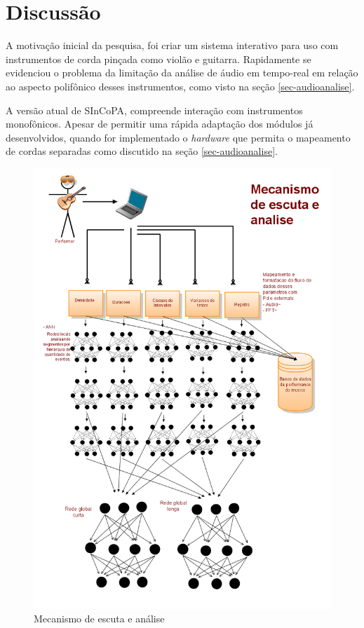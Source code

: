 \documentclass{ppgmus}
\begin{document}
\section{Discussão}


A motivação inicial da pesquisa, foi criar um sistema interativo
para uso com instrumentos de corda pinçada como violão e guitarra.
Rapidamente se evidenciou o problema da limitação da análise de áudio 
em tempo-real em relação ao aspecto polifônico desses instrumentos, 
como visto na seção \ref{sec-audioanalise}.

A versão atual de SInCoPA, compreende interação com instrumentos
monofônicos. Apesar de permitir uma rápida adaptação dos módulos já desenvolvidos, 
quando for implementado o \textit{hardware} que permita o mapeamento de 
cordas separadas como discutido na seção \ref{sec-audioanalise}.




\begin{figure}
\includegraphics[scale=.5]{escuta}
\caption{Mecanismo de escuta e análise}
\label{escuta}
\end{figure}
\end{document}
